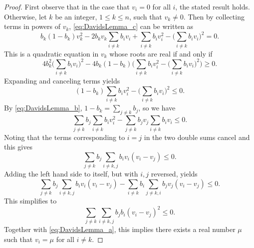 \begin{proof}
    First observe that in the case that $v_i=0$ for all $i$, the stated
    result holds.  Otherwise, let $k$ be an integer,  $1 \leq k \leq n$,
    such that $v_k \ne 0$.
    Then by collecting terms in powers of $v_k$, \eqref{eq:DavidsLemma_c} 
    can be written as
    \begin{equation*}
    		b_k(1-b_k)v_k^2 - 2b_k v_k\sum_{i \neq k}b_i v_i + \sum_{i \neq k}b_i v_i^2 - \biggl(\sum_{i \neq k}b_i v_i\biggr)^{\!\! 2} = 0.  		
	\end{equation*}
	This is a quadratic equation in $v_k$ whose roots are real if and only if
	\begin{equation*}
    		4b_k^2\biggl(\sum_{i \neq k}b_i v_i\biggr)^{\!\! 2} - 4b_k(1-b_k)\Biggl(\sum_{i \neq k}b_i v_i^2 - \biggl(\sum_{i \neq k}b_i v_i\biggr)^{\!\! 2}\Biggr) \geq 0.
	\end{equation*}
	Expanding and canceling terms yields
	\begin{equation*}
    (1-b_k)\sum_{i \neq k}b_i v_i^2 - \biggl(\sum_{i \neq k}b_i v_i\biggr)^{\!\! 2} \leq 0.
	\end{equation*}
	By \eqref{eq:DavidsLemma_b}, $1-b_k = \sum_{j \ne k}b_j$, so we have
	\begin{equation*}
    		\sum_{j \neq k}b_j\sum_{i \neq k}b_i v_i^2 - \sum_{j \neq k}b_j v_j\sum_{i \neq k}b_i v_i \leq 0.
	\end{equation*}
	Noting that the terms corresponding to $i = j$ in the two double sums cancel and this gives
	\begin{equation*}
    		\sum_{j \neq k}b_j\sum_{i \neq k,j}b_i v_i(v_i - v_j) \leq 0.
	\end{equation*}
	Adding the left hand side to itself, but with $i, j$ reversed, yields
	\begin{equation*}
    		\sum_{j \neq k}b_j\sum_{i \neq k, j}b_i v_i(v_i - v_j) - \sum_{i \neq k}b_i\sum_{j \neq k, i}b_j v_j(v_i - v_j) \leq 0.
	\end{equation*}
	This simplifies to
	\begin{equation*}
    		\sum_{j \neq k}\sum_{i \neq k, j}b_j b_i(v_i - v_j)^2 \leq 0.
	\end{equation*}
	Together with \eqref{eq:DavidsLemma_a}, this implies there exists a real number $\mu$
	such that $v_i = \mu$ for all $i \neq k$.


\end{proof}
